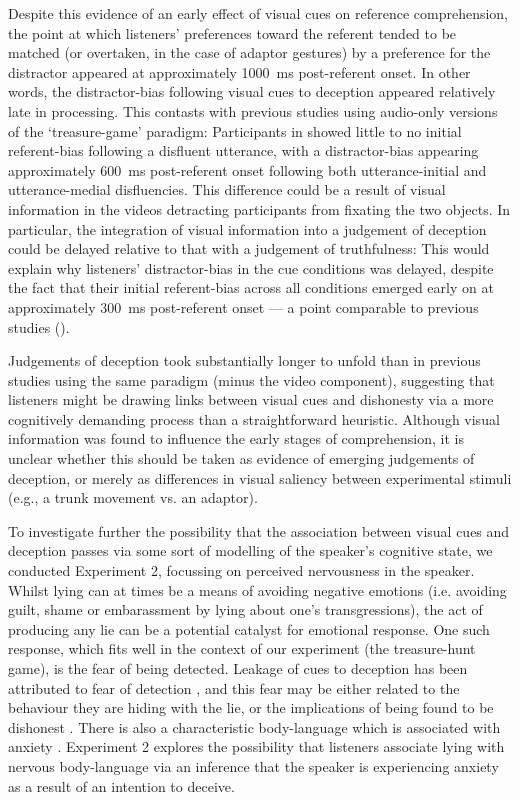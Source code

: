 \documentclass[a4paper,man,natbib]{apa6}
\begin{document}
Despite this evidence of an early effect of visual cues on reference comprehension, the point at which listeners' preferences toward the referent tended to be matched (or overtaken, in the case of adaptor gestures) by a preference for the distractor appeared at approximately 1000~ms post-referent onset. 
In other words, the distractor-bias following visual cues to deception appeared relatively late in processing.
This contasts with previous studies using audio-only versions of the `treasure-game' paradigm: Participants in \citet{Loy2017} showed little to no initial referent-bias following a disfluent utterance, with a distractor-bias appearing approximately 600~ms post-referent onset following both utterance-initial and utterance-medial disfluencies. 
This difference could be a result of visual information in the videos detracting participants from fixating the two objects. 
In particular, the integration of visual information into a judgement of deception could be delayed relative to that with a judgement of truthfulness: 
This would explain why listeners' distractor-bias in the cue conditions was delayed, despite the fact that their initial referent-bias across all conditions emerged early on at approximately 300~ms post-referent onset --- a point comparable to previous studies (\citealt{Loy2017, King2018}). 

Judgements of deception took substantially longer to unfold than in previous studies using the same paradigm (minus the video component), suggesting that listeners might be drawing links between visual cues and dishonesty via a more cognitively demanding process than a straightforward heuristic.
Although visual information was found to influence the early stages of comprehension, it is unclear whether this should be taken as evidence of emerging judgements of deception, or merely as differences in visual saliency between experimental stimuli (e.g., a trunk movement vs. an adaptor).

To investigate further the possibility that the association between visual cues and deception passes via some sort of modelling of the speaker's cognitive state, we conducted Experiment 2, focussing on perceived nervousness in the speaker.
Whilst lying can at times be a means of avoiding negative emotions (i.e. avoiding guilt, shame or embarassment by lying about one's transgressions), the act of producing any lie can be a potential catalyst for emotional response.
One such response, which fits well in the context of our experiment (the treasure-hunt game), is the fear of being detected.
Leakage of cues to deception has been attributed to fear of detection \citep{Ekman2009}, and this fear may be either related to the behaviour they are hiding with the lie, or the implications of being found to be dishonest \citep{Schlenker2001}. 
There is also a characteristic body-language which is associated with anxiety \citep[see also][]{Gregersen2005}. 
Experiment 2 explores the possibility that listeners associate lying with nervous body-language via an inference that the speaker is experiencing anxiety as a result of an intention to deceive. 
\end{document}
